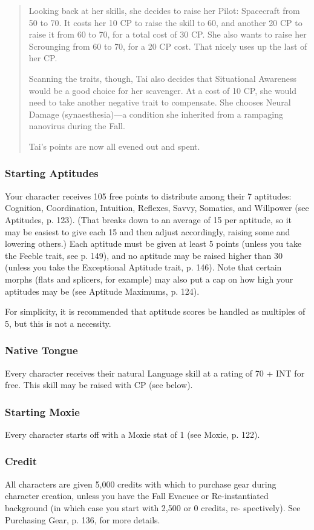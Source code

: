 \begin{quotation}
Looking back at her skills, she decides to raise her Pilot: Spacecraft from 50
to 70. It costs her 10 CP to raise the skill to 60, and another 20 CP to raise
it from 60 to 70, for a total cost of 30 CP. She also wants to raise her
Scrounging from 60 to 70, for a 20 CP cost.  That nicely uses up the last of
her CP.

Scanning the traits, though, Tai also decides that Situational Awareness would
be a good choice for her scavenger. At a cost of 10 CP, she would need to take
another negative trait to compensate. She chooses Neural Damage
(synaesthesia)—a condition she inherited from a rampaging nanovirus during the
Fall.

Tai’s points are now all evened out and spent.
\end{quotation}


\subsubsection{Starting Aptitudes}
Your character receives 105 free points to distribute among their 7 aptitudes:
Cognition, Coordination, Intuition, Reflexes, Savvy, Somatics, and Willpower
(see Aptitudes, p. 123). (That breaks down to an average of 15 per aptitude,
so it may be easiest to give each 15 and then adjust accordingly, raising some
and lowering others.) Each aptitude must be given at least 5 points (unless you
take the Feeble trait, see p. 149), and no aptitude may be raised higher than
30 (unless you take the Exceptional Aptitude trait, p. 146). Note that certain
morphs (flats and splicers, for example) may also put a cap on how high your
aptitudes may be (see Aptitude Maximums, p. 124).

For simplicity, it is recommended that aptitude scores be handled as multiples
of 5, but this is not a necessity.

\subsubsection{Native Tongue}
Every character receives their natural Language skill at a rating of 70 + INT
for free. This skill may be raised with CP (see below).

\subsubsection{Starting Moxie}
Every character starts off with a Moxie stat of 1 (see Moxie, p. 122).

\subsubsection{Credit}
All characters are given 5,000 credits with which to purchase gear during
character creation, unless you have the Fall Evacuee or Re-instantiated
background (in which case you start with 2,500 or 0 credits, re-
spectively). See Purchasing Gear, p. 136, for more details.

